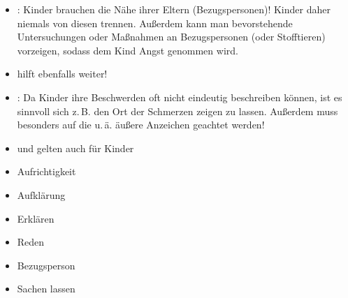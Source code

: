 {\begin{itemize}
  \item {}: Kinder brauchen die Nähe ihrer Eltern
  (Bezugspersonen)! Kinder daher niemals von diesen trennen. Außerdem kann man
  bevorstehende Untersuchungen oder Maßnahmen an Bezugspersonen (oder
  Stofftieren) vorzeigen, sodass dem Kind Angst genommen wird.
  \item {} hilft ebenfalls weiter!
  \item {}: Da Kinder ihre Beschwerden oft nicht
  eindeutig beschreiben können, ist es sinnvoll sich z.\,B. den
  Ort der Schmerzen zeigen zu lassen. Außerdem muss besonders auf die
   u.\,ä.
  äußere Anzeichen geachtet werden!
\end{itemize}
}{
\begin{itemize}
  \item {} und  gelten auch
  für Kinder
  \item Aufrichtigkeit
  \item Aufklärung
  \item Erklären
  \item Reden
  \item Bezugsperson
  \item Sachen  lassen
\end{itemize}
}{}{}{}
